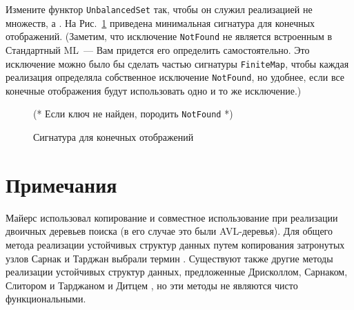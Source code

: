 \begin{exercise}\label{ex:2.6}
  Измените функтор \lstinline!UnbalancedSet! так, чтобы он служил
  реализацией не множеств, а . На
  Рис.~\ref{fig:2.10} приведена минимальная сигнатура для конечных
  отображений. (Заметим, что исключение \lstinline!NotFound! не
  является встроенным в Стандартный ML~--- Вам придется его определить
  самостоятельно. Это исключение можно было бы сделать частью
  сигнатуры \lstinline!FiniteMap!,  чтобы каждая реализация
  определяла собственное исключение \lstinline!NotFound!, но удобнее,
  если все конечные отображения будут использовать одно и то же
  исключение.)
\end{exercise}

\begin{figure}
  \centering

  (* Если ключ не найден, породить \lstinline!NotFound! *)

  \caption{Сигнатура для конечных отображений}
  \label{fig:2.10}
\end{figure}

\section{Примечания}
\label{sc:2.3}

Майерс \cite{Myers1982,Myers1984} использовал копирование и совместное использование
при реализации двоичных деревьев поиска (в его случае это были
AVL-деревья).  Для общего метода реализации устойчивых структур данных
путем копирования затронутых узлов
Сарнак и Тарджан \cite{SarnakTarjan1986a} выбрали термин
. Существуют также другие методы
реализации устойчивых структур данных, предложенные Дрисколлом,
Сарнаком, Слитором и Тарджаном \cite{DSST1989} и Дитцем
\cite{Dietz1989}, но эти методы не являются чисто функциональными.

